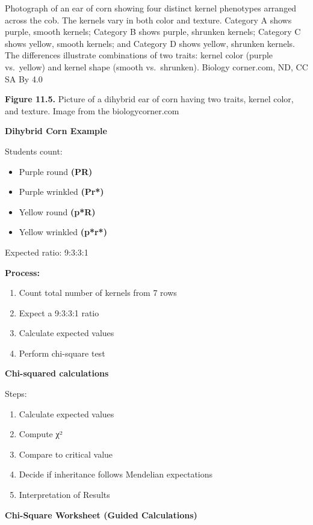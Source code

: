 \documentclass[
  letterpaper,
  DIV=11,
  numbers=noendperiod]{scrreprt}
\begin{document}
Photograph of an ear of corn showing four distinct kernel phenotypes
arranged across the cob. The kernels vary in both color and texture.
Category A shows purple, smooth kernels; Category B shows purple,
shrunken kernels; Category C shows yellow, smooth kernels; and Category
D shows yellow, shrunken kernels. The differences illustrate
combinations of two traits: kernel color (purple vs.~yellow) and kernel
shape (smooth vs.~shrunken). Biology corner.com, ND, CC SA By 4.0

\textbf{Figure 11.5.} Picture of a dihybrid ear of corn having two
traits, kernel color, and texture. Image from the biologycorner.com

\textbf{Dihybrid Corn Example}

Students count:

\begin{itemize}
\item
  Purple round \textbf{(PR)}
\item
  Purple wrinkled \textbf{(Pr*)}
\item
  Yellow round \textbf{(p*R)}
\item
  Yellow wrinkled \textbf{(p*r*)}
\end{itemize}

Expected ratio: 9:3:3:1

\textbf{Process:}

\begin{enumerate}
\def\labelenumi{\arabic{enumi}.}
\item
  Count total number of kernels from 7 rows
\item
  Expect a 9:3:3:1 ratio
\item
  Calculate expected values
\item
  Perform chi-square test
\end{enumerate}

\textbf{Chi-squared calculations}

Steps:

\begin{enumerate}
\def\labelenumi{\arabic{enumi}.}
\item
  Calculate expected values
\item
  Compute χ²
\item
  Compare to critical value
\item
  Decide if inheritance follows Mendelian expectations
\item
  Interpretation of Results
\end{enumerate}

\textbf{Chi-Square Worksheet (Guided Calculations)}
\end{document}
